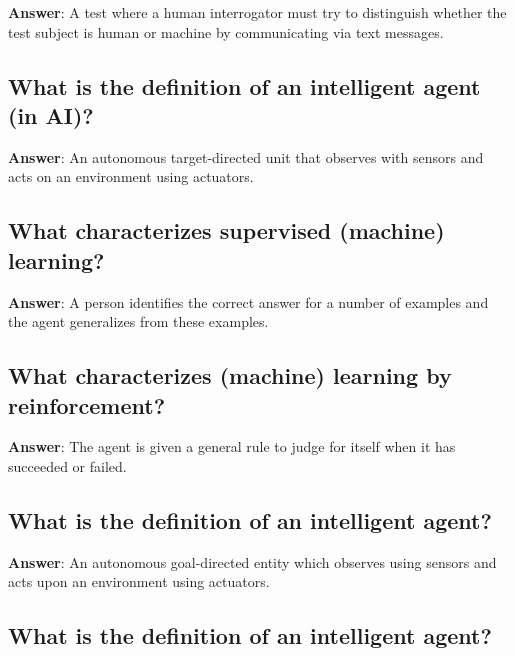 \documentclass[a4paper,11pt,oneside]{article}
\begin{document}
\begin{sloppypar}
\label{q:322:sa:en:True}

\textbf{Answer}: A test where a human interrogator must try to distinguish whether the test subject is human or machine by communicating via text messages.



\subsection{What is the definition of an intelligent agent (in AI)?}

\label{q:323:sa:en:True}

\textbf{Answer}: An autonomous target-directed unit that observes with sensors and acts on an environment using actuators.



\subsection{What characterizes supervised (machine) learning?}

\label{q:324:sa:en:True}

\textbf{Answer}: A person identifies the correct answer for a number of examples and the agent generalizes from these examples.



\subsection{What characterizes (machine) learning by reinforcement?}

\label{q:325:sa:en:True}

\textbf{Answer}: The agent is given a general rule to judge for itself when it has succeeded or failed.



\subsection{What is the definition of an intelligent agent?}

\label{q:326:sa:en:True}

\textbf{Answer}: An autonomous goal-directed entity which observes using sensors and acts upon an environment using actuators.



\subsection{What is the definition of an intelligent agent?}


\end{sloppypar}
\end{document}

